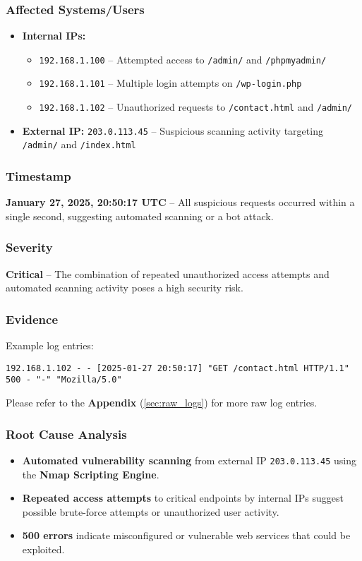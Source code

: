 \documentclass[11pt]{article}
\begin{document}
\subsubsection{Affected Systems/Users}
\begin{itemize}
    \item \textbf{Internal IPs:} 
    \begin{itemize}
        \item \texttt{192.168.1.100} – Attempted access to \texttt{/admin/} and \texttt{/phpmyadmin/}
        \item \texttt{192.168.1.101} – Multiple login attempts on \texttt{/wp-login.php}
        \item \texttt{192.168.1.102} – Unauthorized requests to \texttt{/contact.html} and \texttt{/admin/}
    \end{itemize}
    \item \textbf{External IP:} \texttt{203.0.113.45} – Suspicious scanning activity targeting \texttt{/admin/} and \texttt{/index.html}
\end{itemize}

\subsubsection{Timestamp}
\textbf{January 27, 2025, 20:50:17 UTC} – All suspicious requests occurred within a single second, suggesting automated scanning or a bot attack.

\subsubsection{Severity}
\textbf{Critical} – The combination of repeated unauthorized access attempts and automated scanning activity poses a high security risk.

\subsubsection{Evidence}
Example log entries:
\begin{verbatim}
192.168.1.102 - - [2025-01-27 20:50:17] "GET /contact.html HTTP/1.1" 500 - "-" "Mozilla/5.0"
\end{verbatim}

Please refer to the \textbf{Appendix} (\ref{sec:raw_logs}) for more raw log entries.


\subsubsection{Root Cause Analysis}
\begin{itemize}
    \item \textbf{Automated vulnerability scanning} from external IP \texttt{203.0.113.45} using the \textbf{Nmap Scripting Engine}.
    \item \textbf{Repeated access attempts} to critical endpoints by internal IPs suggest possible brute-force attempts or unauthorized user activity.
    \item \textbf{500 errors} indicate misconfigured or vulnerable web services that could be exploited.
\end{itemize}
\end{document}
